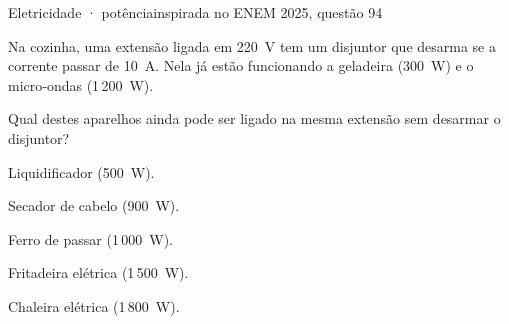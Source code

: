 \clearpage
\begin{treino}{Eletricidade · potência\hfill\normalfont\footnotesize inspirada no ENEM 2025, questão 94}
\begin{minipage}[c]{0.56\linewidth}
Na cozinha, uma extensão ligada em 220~V tem um disjuntor que desarma se a corrente passar de 10~A. Nela já estão funcionando
a geladeira (300~W) e o micro‑ondas (1\,200~W).

\smallskip Qual destes aparelhos ainda pode ser ligado na mesma extensão sem desarmar o disjuntor?
\end{minipage}\hfill
\begin{minipage}[c]{0.41\linewidth}\centering
{}
\end{minipage}
\begin{alternativas}
  \item Liquidificador (500~W).
  \item Secador de cabelo (900~W).
  \item Ferro de passar (1\,000~W).
  \item Fritadeira elétrica (1\,500~W).
  \item Chaleira elétrica (1\,800~W).
\end{alternativas}
\end{treino}


